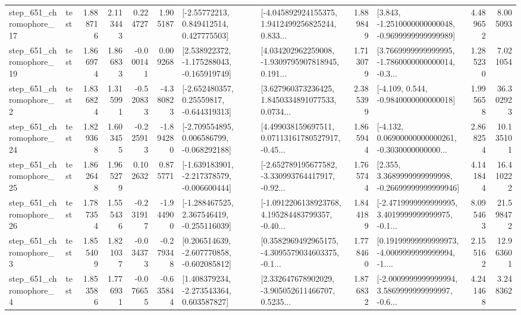 \begin{tabular}{llrrrrllrlrr}
  step\_651\_chromophore\_17 &      test &      1.888716 &    2.113443 &      0.224727 &  1.905187 &     [-2.55772213, 0.849412514, 0.427775503] &  [-4.045892924155375, 1.9412499256825244, 0.833... &       1.889849 &  [3.843, -1.2510000000000048, -0.9699999999999989] &            4.489652 &          8.005093 \\
  step\_651\_chromophore\_19 &      test &      1.866974 &    1.866833 &     -0.000141 &  0.009268 &   [2.538922372, -1.175288043, -0.165919749] &  [4.034202962259008, -1.9309795907818945, 0.191... &       1.713079 &  [3.7669999999999995, -1.7860000000000014, -0.3... &            1.285230 &          7.021054 \\
   step\_651\_chromophore\_2 &      test &      1.836824 &    1.315991 &     -0.520833 & -4.380823 &    [-2.652480357, 0.25559817, -0.644319313] &  [3.627960373236425, 1.8450334891077533, 0.0734... &       2.385399 &               [-4.109, 0.544, -0.9840000000000018] &            1.995658 &         36.302923 \\
  step\_651\_chromophore\_24 &      test &      1.829368 &    1.603455 &     -0.225913 & -1.894280 &   [-2.709554895, 0.006586799, -0.068292188] &  [4.499038159697511, 0.07113161780527917, -0.45... &       1.865944 &  [-4.132, 0.06900000000000261, -0.3030000000000... &            2.868254 &         10.135101 \\
  step\_651\_chromophore\_25 &      test &      1.862648 &    1.965279 &      0.102632 &  0.875771 &  [-1.639183901, -2.217378579, -0.006600444] &  [-2.652789195677582, -3.330993764417917, -0.92... &       1.765744 &  [2.355, 3.3689999999999998, -0.26699999999999946] &            4.141844 &         16.410222 \\
  step\_651\_chromophore\_26 &      test &      1.787354 &    1.555436 &     -0.231917 & -1.944900 &   [-1.288467525, 2.367546419, -0.255116039] &  [-1.0912206138923768, 4.195284483799357, -0.40... &       1.844189 &  [-2.4719999999999995, 3.4019999999999975, -0.1... &            8.095463 &         21.598472 \\
   step\_651\_chromophore\_3 &      test &      1.855409 &    1.821037 &     -0.034373 & -0.279348 &   [0.206514639, -2.607770858, -0.602085812] &  [0.3582969492965175, -4.3095579034603375, -0.1... &       1.778460 &  [0.19199999999999973, -4.0009999999999994, -1.... &            2.155162 &         12.963601 \\
   step\_651\_chromophore\_4 &      test &      1.853586 &    1.776931 &     -0.076655 & -0.635844 &    [1.408379234, -2.273543364, 0.603587827] &  [2.332647678902029, -3.905052611466707, 0.5235... &       1.876832 &  [-2.0009999999999994, 3.5869999999999997, -0.6... &            4.241468 &          3.248362 \\

\end{tabular}
